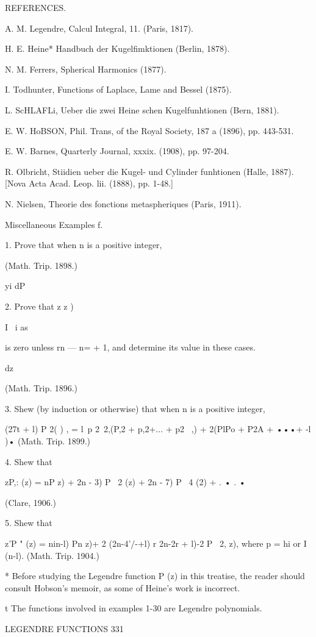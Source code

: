 {{{{REFERENCES.

A. M. Legendre, Calcul Integral, 11. (Paris, 1817).

H. E. Heine* Handbuch der Kugelfimktionen (Berlin, 1878).

N. M. Ferrers, Spherical Harmonics (1877).

I. Todhunter, Functions of Laplace, Lame and Bessel (1875).

L. ScHLAFLi, Ueber die zwei Heine schen Kugelfunhtionen (Bern, 1881).

E. W. HoBSON, Phil. Trans, of the Royal Society, 187 a (1896), pp.
443-531.

E. W. Barnes, Quarterly Journal, xxxix. (1908), pp. 97-204.

R. Olbricht, Stiidien ueber die Kugel- und Cylinder funhtionen (Halle,
1887). [Nova Acta Acad. Leop. lii. (1888), pp. 1-48.]

N. Nielsen, Theorie des fonctions metaspheriques (Paris, 1911).

Miscellaneous Examples f.

1. Prove that when n is a positive integer,

(Math. Trip. 1898.)

yi dP

2. Prove that z z )

I \ i as

is zero unless rn — n= + 1, and determine its value in these cases.

dz

(Math. Trip. 1896.)

3. Shew (by induction or otherwise) that when n is a positive integer,

(27t + l) P 2( ) , = l\ p 2\ 2,(P,2 + p,2+... + p2 \ ,) + 2(PlPo + P2A
+ •••+ -l )• (Math. Trip. 1899.)

4. Shew that

zP,: (z) = nP z) + 2n - 3) P \ 2 (z) + 2n - 7) P \ 4 (2) + . • . •

(Clare, 1906.)

5. Shew that

z'P " (z) = nin-l) Pn z)+ 2 (2n-4'/-+l) r 2n-2r + l)-2 P \ 2, z),
where p = hi or I (n-l). (Math. Trip. 1904.)

* Before studying the Legendre function P (z) in this treatise, the
reader should consult Hobson's memoir, as some of Heine's work is
incorrect.

t The functions involved in examples 1-30 are Legendre polynomials.

LEGENDRE FUNCTIONS 331

}}}}
